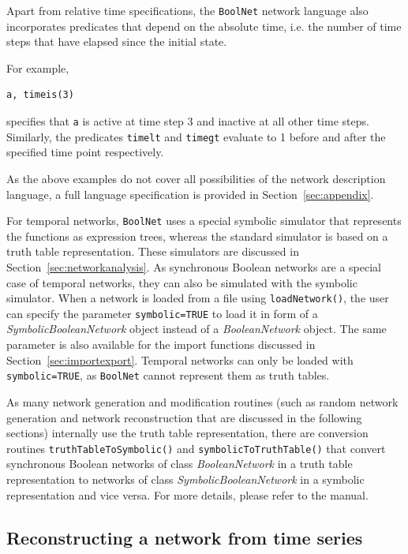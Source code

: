 \documentclass[a4paper]{article}
\begin{document}
Apart from relative time specifications, the \texttt{BoolNet} network language also incorporates predicates that depend on the absolute time, i.e. the number of time steps that have elapsed since the initial state. 

\begin{samepage}
For example,
\begin{verbatim}
a, timeis(3)
\end{verbatim}
specifies that \texttt{a} is active at time step 3 and inactive at all other time steps. Similarly, the predicates \texttt{timelt} and \texttt{timegt} evaluate to 1 before and after the specified time point respectively.
\end{samepage}

As the above examples do not cover all possibilities of the network description language, a full language specification is provided in Section~\ref{sec:appendix}.

For temporal networks, \texttt{BoolNet} uses a special symbolic simulator that represents the functions as expression trees, whereas the standard simulator is based on a truth table representation. These simulators are discussed in Section~\ref{sec:networkanalysis}. As synchronous Boolean networks are a special case of temporal networks, they can also be simulated with the symbolic simulator. When a network is loaded from a file using \texttt{loadNetwork()}, the user can specify the parameter \texttt{symbolic=TRUE} to load it in form of a \emph{SymbolicBooleanNetwork} object instead of a \emph{BooleanNetwork} object. The same parameter is also available for the import functions discussed in Section~\ref{sec:importexport}. Temporal networks can only be loaded with \texttt{symbolic=TRUE}, as \texttt{BoolNet} cannot represent them as truth tables.

\begin{sloppypar}
As many network generation and modification routines (such as random network generation and network reconstruction that are discussed in the following sections) internally use the truth table representation, there are conversion routines \texttt{truthTableToSymbolic()} and \texttt{symbolicToTruthTable()} that convert synchronous Boolean networks of class \emph{BooleanNetwork} in a truth table representation to networks of class \emph{SymbolicBooleanNetwork} in a symbolic representation and vice versa. For more details, please refer to the manual.
\end{sloppypar}

\subsection{Reconstructing a network from time series}
\end{document}
